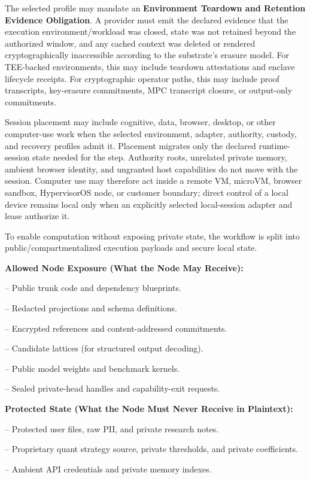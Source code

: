 \documentclass[
  11pt,
]{article}
\begin{document}
The selected profile may mandate an \textbf{Environment Teardown and Retention
Evidence Obligation}. A provider must emit the declared evidence that the
execution environment/workload was closed, state was not retained beyond the
authorized window, and any cached context was deleted or
rendered cryptographically inaccessible according to the substrate's
erasure model. For TEE-backed environments, this may include teardown
attestations and enclave lifecycle receipts. For cryptographic operator
paths, this may include proof transcripts, key-erasure commitments, MPC
transcript closure, or output-only commitments.

Session placement may include cognitive, data, browser, desktop, or other
computer-use work when the selected environment, adapter, authority, custody,
and recovery profiles admit it. Placement migrates only the declared
runtime-session state needed for the step. Authority roots, unrelated private
memory, ambient browser identity, and ungranted host capabilities do not move
with the session. Computer use may therefore act inside a remote VM, microVM,
browser sandbox, HypervisorOS node, or customer boundary; direct control of a
local device remains local only when an explicitly selected local-session
adapter and lease authorize it.

To enable computation without exposing private state, the workflow is
split into public/compartmentalized execution payloads and secure local
state.

\textbf{Allowed Node Exposure (What the Node May Receive):}

-- Public trunk code and dependency blueprints.

-- Redacted projections and schema definitions.

-- Encrypted references and content-addressed commitments.

-- Candidate lattices (for structured output decoding).

-- Public model weights and benchmark kernels.

-- Sealed private-head handles and capability-exit requests.

\textbf{Protected State (What the Node Must Never Receive in
Plaintext):}

-- Protected user files, raw PII, and private research notes.

-- Proprietary quant strategy source, private thresholds, and private
coefficients.

-- Ambient API credentials and private memory indexes.
\end{document}
